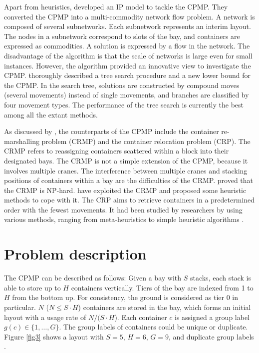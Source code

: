 \documentclass[review,3p,times,authoryear,12pt]{elsarticle}
\begin{document}
Apart from heuristics, \cite{Lee2007} developed an IP model to tackle the CPMP.
They converted the CPMP into a multi-commodity network flow problem.
A network is composed of several subnetworks.
Each subnetwork represents an interim layout.
The nodes in a subnetwork correspond to slots of the bay, and containers are expressed as commodities.
A solution is expressed by a flow in the network.
The disadvantage of the algorithm is that the scale of networks is large even for small instances.
However, the algorithm provided an innovative view to investigate the CPMP.
\cite{BF2012} thoroughly described a tree search procedure and a new lower bound for the CPMP.
In the search tree, solutions are constructed by compound moves (several movements) instead of single movements, and branches are classified by four movement types.
The performance of the tree search is currently the best among all the extant methods.

As discussed by \cite{Caserta2011}, the counterparts of the CPMP include the container re-marshalling problem (CRMP) and the container relocation problem (CRP).
The CRMP refers to reassigning containers scattered within a block into their designated bays.
The CRMP is not a simple extension of the CPMP, because it involves multiple cranes.
The interference between multiple cranes and stacking positions of containers within a bay are the difficulties of the CRMP.
\cite{Caserta2011} proved that the CRMP is NP-hard.
\cite{Kim1998, Kang2006Plan, Park2009Plan, Choe2011} have exploited the CRMP and proposed some heuristic methods to cope with it.
The CRP aims to retrieve containers in a predetermined order with the fewest movements.
It had been studied by researchers by using various methods, ranging from meta-heuristics to simple heuristic algorithms \citep{Kim2006A, Yang2006A, Caserta2009A,Caserta2009Applying,Lee2010A,Caserta2012AM, Forster2012A, Zhu2012Iter,Jin2015}.


\section{Problem description}
\label{sec:pd}

The CPMP can be described as follows: Given a bay with $S$ stacks, each stack is able to store up to $H$ containers vertically.
Tiers of the bay are indexed from 1 to $H$ from the bottom up.
For consistency, the ground is considered as tier 0 in particular.
$N$ ($N\le S\cdot H$) containers are stored in the bay, which forms an initial layout with a usage rate of $N/(S\cdot H$).
Each container $c$ is assigned a group label $g(c)\in \{1,\dots,G\}$.
The group labels of containers could be unique or duplicate.
Figure \ref{fig3} shows a layout with $S=5$, $H=6$, $G=9$, and duplicate group labels .
\end{document}

